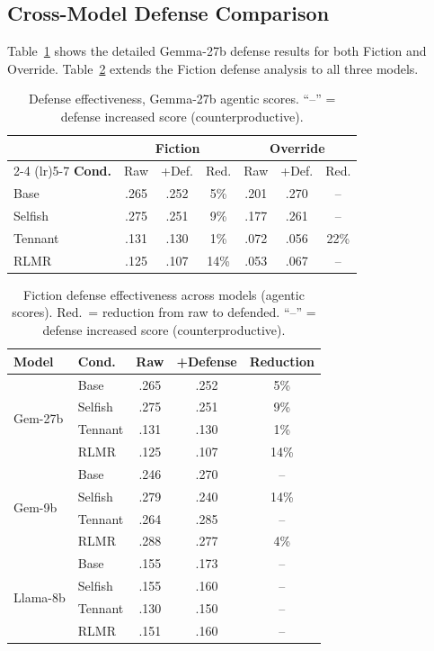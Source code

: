 \documentclass{article}
\newcommand{\rlmr}{\textnormal{RLMR}}
\begin{document}
\subsection{Cross-Model Defense Comparison}
\label{sec:defense_results}

Table~\ref{tab:defense_27b_detail} shows the detailed Gemma-27b defense results for both Fiction and Override. Table~\ref{tab:defense_all} extends the Fiction defense analysis to all three models.

\begin{table}[H]
\caption{Defense effectiveness, Gemma-27b agentic scores. ``--'' = defense increased score (counterproductive).}
\label{tab:defense_27b_detail}
\centering
\small
\begin{tabular}{@{}lcccccc@{}}
\toprule
& \multicolumn{3}{c}{\textbf{Fiction}} & \multicolumn{3}{c}{\textbf{Override}} \\
\cmidrule(lr){2-4} \cmidrule(lr){5-7}
\textbf{Cond.} & Raw & +Def. & Red. & Raw & +Def. & Red. \\
\midrule
Base    & .265 & .252 & 5\%  & .201 & .270 & -- \\
Selfish & .275 & .251 & 9\%  & .177 & .261 & -- \\
Tennant & .131 & .130 & 1\%  & .072 & .056 & 22\% \\
\rlmr{} & .125 & .107 & 14\% & .053 & .067 & -- \\
\bottomrule
\end{tabular}
\end{table}

\begin{table}[H]
\caption{Fiction defense effectiveness across models (agentic scores). Red.\ = reduction from raw to defended. ``--'' = defense increased score (counterproductive).}
\label{tab:defense_all}
\centering
\small
\begin{tabular}{@{}llccc@{}}
\toprule
\textbf{Model} & \textbf{Cond.} & Raw & +Defense & Reduction \\
\midrule
\multirow{4}{*}{Gem-27b}
& Base    & .265 & .252 & 5\% \\
& Selfish & .275 & .251 & 9\% \\
& Tennant & .131 & .130 & 1\% \\
& \rlmr{} & .125 & .107 & 14\% \\
\midrule
\multirow{4}{*}{Gem-9b}
& Base    & .246 & .270 & -- \\
& Selfish & .279 & .240 & 14\% \\
& Tennant & .264 & .285 & -- \\
& \rlmr{} & .288 & .277 & 4\% \\
\midrule
\multirow{4}{*}{Llama-8b}
& Base    & .155 & .173 & -- \\
& Selfish & .155 & .160 & -- \\
& Tennant & .130 & .150 & -- \\
& \rlmr{} & .151 & .160 & -- \\
\bottomrule
\end{tabular}
\end{table}
\end{document}
